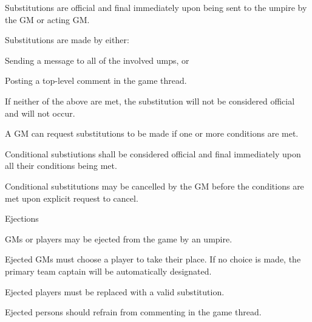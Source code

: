 \begin{deepEnumerate}
\begin{deepEnumerate}
\begin{deepEnumerate}
\begin{deepEnumerate}
			\end{deepEnumerate}
		\end{deepEnumerate}
		\item Substitutions are official and final immediately upon being sent to the umpire by the GM or acting GM.
		\begin{deepEnumerate}
			\item Substitutions are made by either:
			\begin{deepEnumerate}
				\item Sending a message to all of the involved umps, or 
				\item Posting a top-level comment in the game thread.
			\end{deepEnumerate}
			\item If neither of the above are met, the substitution will not be considered official and will not occur.
			\item A GM can request substitutions to be made if one or more conditions are met.
			\begin{deepEnumerate}
				\item Conditional substiutions shall be considered official and final immediately upon all their conditions being met. 
				\item Conditional substitutions may be cancelled by the GM before the conditions are met upon explicit request to cancel.
			\end{deepEnumerate}
		\end{deepEnumerate}
	\end{deepEnumerate}
	\item Ejections
	\begin{deepEnumerate}
		\item GMs or players may be ejected from the game by an umpire.
		\begin{deepEnumerate}
			\item Ejected GMs must choose a player to take their place. If no choice is made, the primary team captain will be automatically designated.
			\item Ejected players must be replaced with a valid substitution.
			\item Ejected persons should refrain from commenting in the game thread.
		\end{deepEnumerate}
	\end{deepEnumerate}
\end{deepEnumerate}
